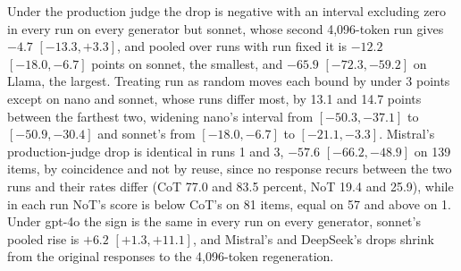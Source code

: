 Under the production judge the drop is negative with an interval excluding
zero in every run on every generator but sonnet, whose second 4,096-token
run gives $-4.7$ $[-13.3, +3.3]$, and pooled over runs with run fixed it is
$-12.2$ $[-18.0, -6.7]$ points on sonnet, the smallest, and $-65.9$
$[-72.3, -59.2]$ on Llama, the largest. Treating run as random moves each
bound by under 3 points except on nano and sonnet, whose runs differ most,
by 13.1 and 14.7 points between the farthest two, widening nano's interval
from $[-50.3, -37.1]$ to $[-50.9, -30.4]$ and sonnet's from $[-18.0, -6.7]$
to $[-21.1, -3.3]$. Mistral's production-judge drop is identical in runs 1
and 3, $-57.6$ $[-66.2, -48.9]$ on 139 items, by coincidence and not by
reuse, since no response recurs between the two runs and their rates differ
(CoT 77.0 and 83.5 percent, NoT 19.4 and 25.9), while in each run NoT's
score is below CoT's on 81 items, equal on 57 and above on 1.
Under gpt-4o the sign is the same in every run on every generator, sonnet's
pooled rise is $+6.2$ $[+1.3, +11.1]$, and Mistral's and DeepSeek's drops
shrink from the original responses to the 4,096-token regeneration.
